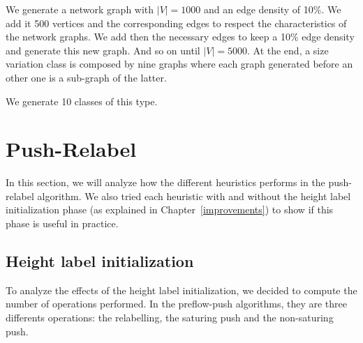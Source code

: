 We generate a network graph with $|V|=1000$ and an edge density of 10\%. We add it 500 vertices and the corresponding edges to respect the characteristics of the network graphs. We add then the necessary edges to keep a 10\% edge density and generate this new graph. And so on until $|V|=5000$. At the end, a size variation class is composed by nine graphs where each graph generated before an other one is a sub-graph of the latter.

We generate 10 classes of this type.



\section{Push-Relabel}

In this section, we will analyze how the different heuristics performs in the push-relabel algorithm. We also tried each heuristic with and without the height label initialization phase (as explained in Chapter~\ref{improvements}) to show if this phase is useful in practice.
\subsection{Height label initialization}

To analyze the effects of the height label initialization, we decided to compute the number of operations performed. In the preflow-push algorithms, they are three differents operations: the relabelling, the saturing push and the non-saturing push.

